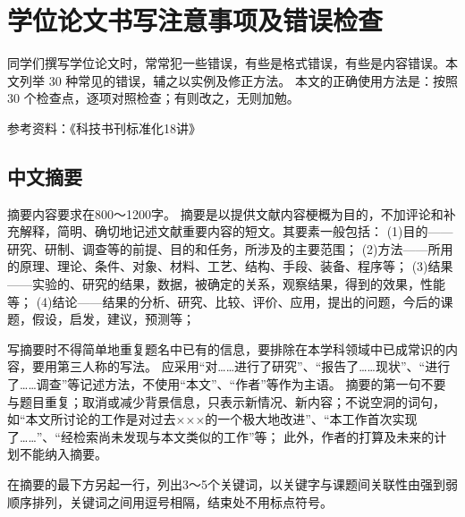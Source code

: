 \chapter{学位论文书写注意事项及错误检查}\label{appendix:checkingthesis}

同学们撰写学位论文时，常常犯一些错误，有些是格式错误，有些是内容错误。本文列举 30 种常见的错误，辅之以实例及修正方法。
本文的正确使用方法是：按照 30 个检查点，逐项对照检查；有则改之，无则加勉。

参考资料：《科技书刊标准化18讲》

\section{中文摘要}

摘要内容要求在800～1200字。
摘要是以提供文献内容梗概为目的，不加评论和补充解释，简明、确切地记述文献重要内容的短文。其要素一般包括：
 (1)目的——研究、研制、调查等的前提、目的和任务，所涉及的主要范围；
 (2)方法——所用的原理、理论、条件、对象、材料、工艺、结构、手段、装备、程序等；
 (3)结果——实验的、研究的结果，数据，被确定的关系，观察结果，得到的效果，性能等；
 (4)结论——结果的分析、研究、比较、评价、应用，提出的问题，今后的课题，假设，启发，建议，预测等； 

写摘要时不得简单地重复题名中已有的信息，要排除在本学科领域中已成常识的内容，要用第三人称的写法。
应采用“对……进行了研究”、“报告了……现状”、“进行了……调查”等记述方法，不使用“本文”、“作者”等作为主语。
摘要的第一句不要与题目重复；取消或减少背景信息，只表示新情况、新内容；不说空洞的词句，
如“本文所讨论的工作是对过去×××的一个极大地改进”、“本工作首次实现了……”、“经检索尚未发现与本文类似的工作”等；
此外，作者的打算及未来的计划不能纳入摘要。

在摘要的最下方另起一行，列出3～5个关键词，以关键字与课题间关联性由强到弱顺序排列，关键词之间用逗号相隔，结束处不用标点符号。


